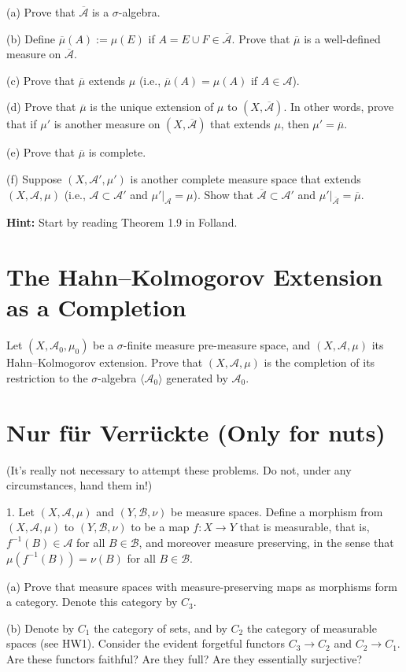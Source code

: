 \documentclass[lang=cn,11pt]{elegantbook}
\begin{document}
(a) Prove that \(\overline{\mathcal{A}}\) is a \(\sigma\)-algebra.

(b) Define \(\overline{\mu}(A) := \mu(E)\) if \(A = E \cup F \in \overline{\mathcal{A}}\). Prove that \(\overline{\mu}\) is a well-defined measure on \(\overline{\mathcal{A}}\).

(c) Prove that \(\overline{\mu}\) extends \(\mu\) (i.e., \(\overline{\mu}(A) = \mu(A)\) if \(A \in \mathcal{A}\)).

(d) Prove that \(\overline{\mu}\) is the unique extension of \(\mu\) to \((X, \overline{\mathcal{A}})\). In other words, prove that if \(\mu'\) is another measure on \((X, \overline{\mathcal{A}})\) that extends \(\mu\), then \(\mu' = \overline{\mu}\).

(e) Prove that \(\overline{\mu}\) is complete.

(f) Suppose \((X, \mathcal{A}', \mu')\) is another complete measure space that extends \((X, \mathcal{A}, \mu)\) (i.e., \(\mathcal{A} \subset \mathcal{A}'\) and \(\mu'|_{\mathcal{A}} = \mu\)). Show that \(\overline{\mathcal{A}} \subset \mathcal{A}'\) and \(\mu'|_{\overline{\mathcal{A}}} = \overline{\mu}\). 

\textbf{Hint:} Start by reading Theorem 1.9 in Folland.

\section{The Hahn--Kolmogorov Extension as a Completion}
Let \((X, \mathcal{A}_0, \mu_0)\) be a \(\sigma\)-finite measure pre-measure space, and \((X, \mathcal{A}, \mu)\) its Hahn–Kolmogorov extension. Prove that \((X, \mathcal{A}, \mu)\) is the completion of its restriction to the \(\sigma\)-algebra \(\langle \mathcal{A}_0 \rangle\) generated by \(\mathcal{A}_0\).



\section{Nur für Verrückte (Only for nuts)}
(It’s really not necessary to attempt these problems. Do not, under any circumstances, hand them in!)

1. Let \((X, \mathcal{A}, \mu)\) and \((Y, \mathcal{B}, \nu)\) be measure spaces. Define a morphism from \((X, \mathcal{A}, \mu)\) to \((Y, \mathcal{B}, \nu)\) to be a map \(f : X \to Y\) that is measurable, that is, \(f^{-1}(B) \in \mathcal{A}\) for all \(B \in \mathcal{B}\), and moreover measure preserving, in the sense that \(\mu(f^{-1}(B)) = \nu(B)\) for all \(B \in \mathcal{B}\).

(a) Prove that measure spaces with measure-preserving maps as morphisms form a category. Denote this category by \(C_3\).

(b) Denote by \(C_1\) the category of sets, and by \(C_2\) the category of measurable spaces (see HW1). Consider the evident forgetful functors \(C_3 \to C_2\) and \(C_2 \to C_1\). Are these functors faithful? Are they full? Are they essentially surjective?
\end{document}
